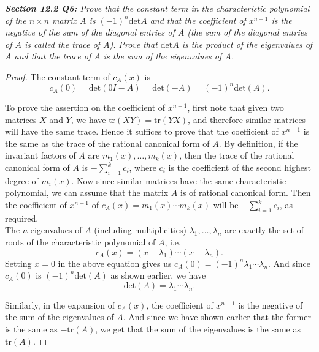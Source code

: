 \documentclass{article}
\begin{document}
\it \textbf{Section 12.2 Q6:} Prove that the constant term in the
  characteristic polynomial of the $n\times n$ matrix $A$ is
  $(-1)^n\text{det}A$ and that the coefficient of $x^{n-1}$ is the negative
  of the sum of the diagonal entries of $A$ (the sum of the diagonal
  entries of $A$ is called the trace of $A$). Prove that $\text{det}A$ is
  the product of the eigenvalues of $A$ and that the trace of $A$ is the
  sum of the eigenvalues of $A$.

  \begin{proof}
    The constant term of $c_A(x)$ is
    \[c_A(0)=\text{det}(0I-A)=\text{det}(-A)=(-1)^n\text{det}(A).\]

    To prove the assertion on the coefficient of $x^{n-1}$, first note that
    given two matrices $X$ and $Y$, we have $\text{tr}(XY)=\text{tr}(YX)$,
    and therefore similar matrices will have the same trace. Hence it
    suffices to prove that the coefficient of $x^{n-1}$ is the same as the
    trace of the rational canonical form of $A$. By definition, if the
    invariant factors of $A$ are $m_1(x),\ldots,m_k(x)$, then the trace of
    the rational canonical form of $A$ is $-\sum_{i=1}^k c_{i}$, where
    $c_{i}$ is the coefficient of the second highest degree of $m_i(x)$.
    Now since similar matrices have the same characteristic polynomial, we
    can assume that the matrix $A$ is of rational canonical form. Then the
    coefficient of $x^{n-1}$ of $c_A(x)=m_1(x)\cdots m_k(x)$ will be
    $-\sum_{i=1}^k c_{i}$, as required. \\

    The $n$ eigenvalues of $A$ (including multiplicities)
    $\lambda_1,\ldots,\lambda_n$ are exactly the set of
    roots of the characteristic polynomial of $A$, i.e.
    \[c_A(x) =(x-\lambda_1)\cdots(x-\lambda_n).\]
    Setting $x=0$ in the above equation gives us
    $c_A(0)=(-1)^n\lambda_1\cdots\lambda_n$. And since $c_A(0)$ is
    $(-1)^n\text{det}(A)$ as shown earlier, we have
    \[\text{det}(A) =\lambda_1\cdots\lambda_n.\]

    Similarly, in the expansion of $c_A(x)$, the coefficient of $x^{n-1}$
    is the negative of the sum of the eigenvalues of $A$. And since we have
    shown earlier that the former is the same as $-\text{tr}(A)$, we get
    that the sum of the eigenvalues is the same as $\text{tr}(A)$.
  \end{proof}
\end{document}
